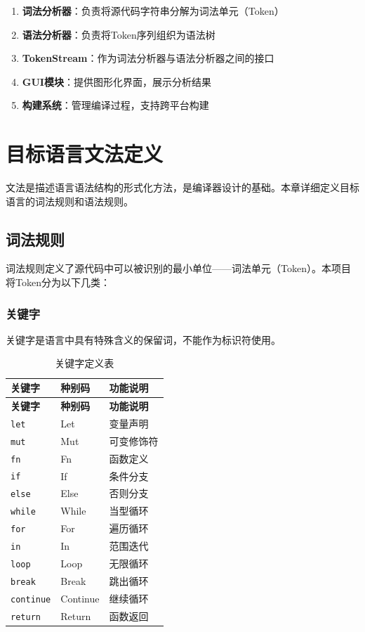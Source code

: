 \documentclass[12pt,a4paper]{ctexart}
\begin{document}
\begin{enumerate}
    \item \textbf{词法分析器}：负责将源代码字符串分解为词法单元（Token）
    \item \textbf{语法分析器}：负责将Token序列组织为语法树
    \item \textbf{TokenStream}：作为词法分析器与语法分析器之间的接口
    \item \textbf{GUI模块}：提供图形化界面，展示分析结果
    \item \textbf{构建系统}：管理编译过程，支持跨平台构建
\end{enumerate}

\newpage

\section{目标语言文法定义}

文法是描述语言语法结构的形式化方法，是编译器设计的基础。本章详细定义目标语言的词法规则和语法规则。

\subsection{词法规则}

词法规则定义了源代码中可以被识别的最小单位——词法单元（Token）。本项目将Token分为以下几类：

\subsubsection{关键字}

关键字是语言中具有特殊含义的保留词，不能作为标识符使用。

\begin{longtable}{|l|l|l|}
\caption{关键字定义表} \label{tab:keywords} \\
\hline
\textbf{关键字} & \textbf{种别码} & \textbf{功能说明} \\
\hline
\endfirsthead
\hline
\textbf{关键字} & \textbf{种别码} & \textbf{功能说明} \\
\hline
\endhead
\hline
\endfoot
\hline
\endlastfoot

\texttt{let} & Let & 变量声明 \\
\texttt{mut} & Mut & 可变修饰符 \\
\texttt{fn} & Fn & 函数定义 \\
\texttt{if} & If & 条件分支 \\
\texttt{else} & Else & 否则分支 \\
\texttt{while} & While & 当型循环 \\
\texttt{for} & For & 遍历循环 \\
\texttt{in} & In & 范围迭代 \\
\texttt{loop} & Loop & 无限循环 \\
\texttt{break} & Break & 跳出循环 \\
\texttt{continue} & Continue & 继续循环 \\
\texttt{return} & Return & 函数返回 \\
\end{longtable}
\end{document}
